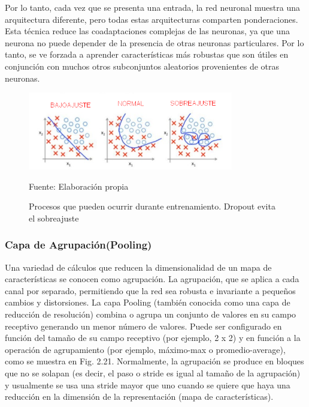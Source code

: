 		\vskip 0.4cm 
		Por lo tanto, cada vez que se presenta una entrada, la red neuronal muestra una arquitectura diferente, pero todas estas arquitecturas comparten ponderaciones. Esta técnica reduce las coadaptaciones complejas de las neuronas, ya que una neurona no puede depender de la presencia de otras neuronas particulares. Por lo tanto, se ve forzada a aprender características más robustas que son útiles en conjunción con muchos otros subconjuntos aleatorios provenientes de otras neuronas.
		\begin{figure}[H]
		\begin{center}
		\includegraphics[width=0.8\textwidth]{images/marcoteorico/dropout}
		\end{center}
		\begin{center}
		\caption{\small{Procesos que pueden ocurrir durante entrenamiento. Dropout evita el sobreajuste}}
		\vskip -0.3cm  
		{\small{Fuente: Elaboración propia}}
		\end{center}
		\vspace{-1.5em}
		\end{figure}

		\vskip 0.4cm 
	\subsubsection {Capa de Agrupación(Pooling)}
		\vskip 0.4cm 

		Una variedad de cálculos que reducen la dimensionalidad de un mapa de características se conocen como agrupación. La agrupación, que se aplica a cada canal por separado, permitiendo que la red sea robusta e invariante a pequeños cambios y distorsiones. La capa Pooling (también conocida como una capa de reducción de resolución) combina o agrupa un conjunto de valores en su campo receptivo generando un menor número de valores. Puede ser configurado en función del tamaño de su campo receptivo (por ejemplo, 2 x 2) y en función a la operación de agrupamiento (por ejemplo, máximo-max o promedio-average), como se muestra en Fig. 2.21. Normalmente, la agrupación se produce en bloques que no se solapan (es decir, el paso o stride es igual al tamaño de la agrupación) y usualmente se usa una stride mayor que uno cuando se quiere que haya una reducción en la dimensión de la representación (mapa de características).

